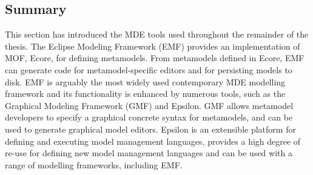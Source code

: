 \subsection{Summary}
This section has introduced the MDE tools used throughout the remainder of the thesis. The Eclipse Modeling Framework (EMF) provides an implementation of MOF, Ecore, for defining metamodels. From metamodels defined in Ecore, EMF can generate code for metamodel-specific editors and for persisting models to disk. EMF is arguably the most widely used contemporary MDE modelling framework and its functionality is enhanced by numerous tools, such as the Graphical Modeling Framework (GMF) and Epsilon. GMF allows metamodel developers to specify a graphical concrete syntax for metamodels, and can be used to generate graphical model editors. Epsilon is an extensible platform for defining and executing model management languages, provides a high degree of re-use for defining new model management languages and can be used with a range of modelling frameworks, including EMF.